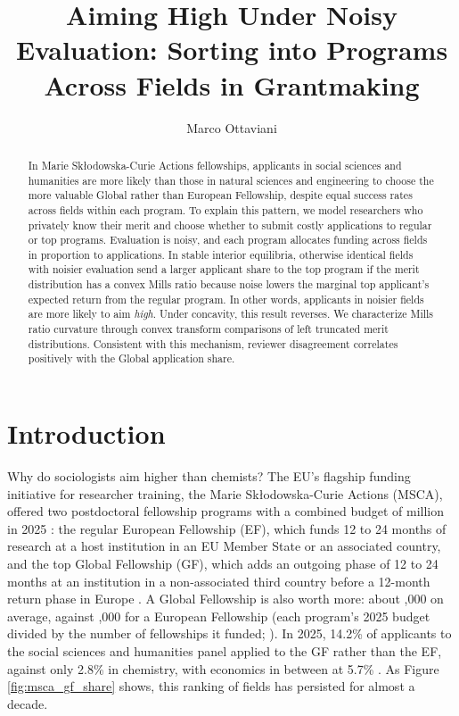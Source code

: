 \documentclass[12pt,reqno]{amsart}
\theoremstyle{definition}
\theoremstyle{plain} %
\begin{document}
\title{Aiming High Under Noisy Evaluation: Sorting into Programs Across Fields in Grantmaking}
\author{Marco Ottaviani}
\begin{abstract}
    In Marie Skłodowska-Curie Actions fellowships, applicants in social sciences and humanities are more likely than those in natural sciences and engineering to choose the more valuable Global rather than European Fellowship, despite equal success rates across fields within each program. To explain this pattern, we model researchers who privately know their merit and choose whether to submit costly applications to regular or top programs. Evaluation is noisy, and each program allocates funding across fields in proportion to applications. In stable interior equilibria, otherwise identical fields with noisier evaluation send a larger applicant share to the top program if the merit distribution has a convex Mills ratio because noise lowers the marginal top applicant’s expected return from the regular program. In other words, applicants in noisier fields are more likely to aim \textit{high}. Under concavity, this result reverses. We characterize Mills ratio curvature through convex transform comparisons of left truncated merit distributions. Consistent with this mechanism, reviewer disagreement correlates positively with the Global application share.
\end{abstract}
\maketitle

\newpage

\section{Introduction}

\noindent Why do sociologists aim higher than chemists? The EU's flagship funding initiative for researcher training, the Marie Sk\l{}odowska-Curie Actions (MSCA), offered two postdoctoral fellowship programs with a combined budget of  million in 2025 \citep[p.~39]{ec2025mscawp}: the regular European Fellowship (EF), which funds 12 to 24 months of research at a host institution in an EU Member State or an associated country, and the top Global Fellowship (GF), which adds an outgoing phase of 12 to 24 months at an institution in a non-associated third country before a 12-month return phase in Europe \citep[p.~131]{ec2025mscawp}. A Global Fellowship is also worth more: about ,000 on average, against ,000 for a European Fellowship (each program's 2025 budget divided by the number of fellowships it funded; \citealp{ec2025mscawp,msca2026results}). In 2025, 14.2\% of applicants to the social sciences and humanities panel applied to the GF rather than the EF, against only 2.8\% in chemistry, with economics in between at 5.7\% \citep{ecpercentiles2025}. As Figure \ref{fig:msca_gf_share} shows, this ranking of fields has persisted for almost a decade.
\end{document}

